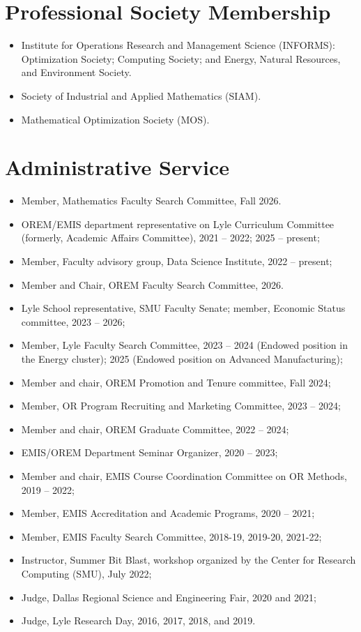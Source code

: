 \documentclass[hyperref, margin]{myResume}
\begin{document}
\begin{resume}
\section{Professional Society Membership}
		\begin{itemize}[leftmargin=1em]
			\item Institute for Operations Research and Management Science (INFORMS): Optimization Society; Computing Society; and Energy, Natural Resources, and Environment Society.
			\item Society of Industrial and Applied Mathematics (SIAM).
			\item Mathematical Optimization Society (MOS).
		\end{itemize}
	
\section{Administrative Service}
	\begin{itemize}[leftmargin=*]
		\item Member, Mathematics Faculty Search Committee, Fall 2026.
		\item OREM/EMIS department representative on Lyle Curriculum Committee (formerly, Academic Affairs Committee), 2021 -- 2022; 2025 -- present;
		\item Member, Faculty advisory group, Data Science Institute, 2022 -- present;
		\item Member and Chair, OREM Faculty Search Committee, 2026.
		\item Lyle School representative, SMU Faculty Senate; member, Economic Status committee, 2023 -- 2026;
		\item Member, Lyle Faculty Search Committee, 2023 -- 2024 (Endowed position in the Energy cluster); 2025 (Endowed position on Advanced Manufacturing);
		\item Member and chair, OREM Promotion and Tenure committee, Fall 2024;
		\item Member, OR Program Recruiting and Marketing Committee, 2023 -- 2024;		
		\item Member and chair, OREM Graduate Committee, 2022 -- 2024;
		\item EMIS/OREM Department Seminar Organizer, 2020 -- 2023;		
		\item Member and chair, EMIS Course Coordination Committee on OR Methods, 2019 -- 2022;
		\item Member, EMIS Accreditation and Academic Programs, 2020 -- 2021;
		\item Member, EMIS Faculty Search Committee, 2018-19, 2019-20, 2021-22;
		\item Instructor, Summer Bit Blast, workshop organized by the Center for Research Computing (SMU), July 2022;
		\item Judge, Dallas Regional Science and Engineering Fair, 2020 and 2021;
		\item Judge, Lyle Research Day, 2016, 2017, 2018, and 2019.
	\end{itemize}
	

\end{resume}
\end{document}
